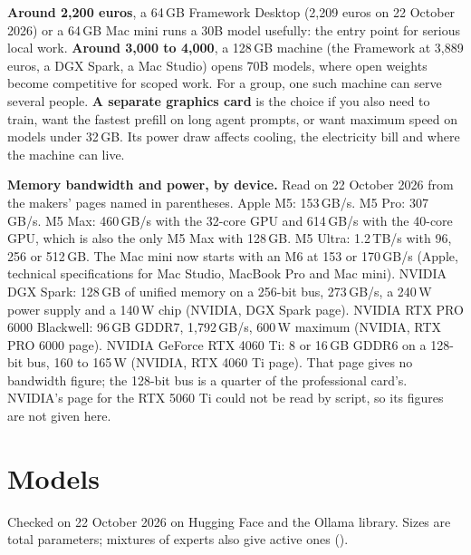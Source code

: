 \textbf{Around 2,200 euros}, a 64\,GB Framework Desktop (2,209 euros on
22 October 2026) or a 64\,GB Mac mini runs a 30B model usefully: the entry
point for serious local work. \textbf{Around 3,000 to 4,000}, a 128\,GB
machine (the Framework at 3,889 euros, a DGX Spark, a Mac Studio) opens 70B
models, where open weights become competitive for scoped work. For a group,
one such machine can serve several people. \textbf{A separate graphics card}
is the choice if you also need to train, want the fastest prefill on long
agent prompts, or want maximum speed on models under 32\,GB. Its power draw
affects cooling, the electricity bill and where the machine can live.

\textbf{Memory bandwidth and power, by device.} Read on 22 October 2026 from
the makers' pages named in parentheses. Apple M5: 153\,GB/s. M5 Pro:
307\,GB/s. M5 Max: 460\,GB/s with the 32-core GPU and 614\,GB/s with the
40-core GPU, which is also the only M5 Max with 128\,GB. M5 Ultra: 1.2\,TB/s
with 96, 256 or 512\,GB. The Mac mini now starts with an M6 at 153 or
170\,GB/s (Apple, technical specifications for Mac Studio, MacBook Pro and
Mac mini). NVIDIA DGX Spark: 128\,GB of unified memory on a 256-bit bus,
273\,GB/s, a 240\,W power supply and a 140\,W chip (NVIDIA, DGX Spark page).
NVIDIA RTX PRO 6000 Blackwell: 96\,GB GDDR7, 1,792\,GB/s, 600\,W maximum
(NVIDIA, RTX PRO 6000 page). NVIDIA GeForce RTX 4060 Ti: 8 or 16\,GB GDDR6 on
a 128-bit bus, 160 to 165\,W (NVIDIA, RTX 4060 Ti page). That page gives no
bandwidth figure; the 128-bit bus is a quarter of the professional card's.
NVIDIA's page for the RTX 5060 Ti could not be read by script, so its figures
are not given here.

\section{Models}

Checked on 22 October 2026 on Hugging Face and the Ollama library. Sizes are
total parameters; mixtures of experts also give active ones
().

